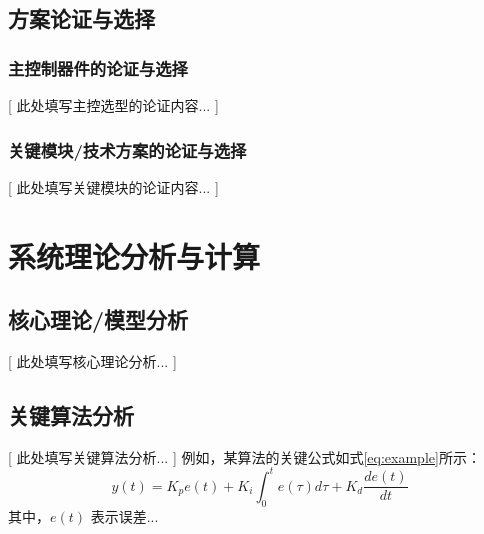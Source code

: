 \documentclass{ctexart}
\begin{document}
\subsection{方案论证与选择}
\subsubsection{主控制器件的论证与选择}
    [ 此处填写主控选型的论证内容... ]

\subsubsection{关键模块/技术方案的论证与选择}
    [ 此处填写关键模块的论证内容... ]

\section{系统理论分析与计算}
\subsection{核心理论/模型分析}
    [ 此处填写核心理论分析... ]
    
    
\subsection{关键算法分析}
    [ 此处填写关键算法分析... ]
    例如，某算法的关键公式如式\ref{eq:example}所示：
    \begin{equation} \label{eq:example}
        y(t) = K_p e(t) + K_i \int_0^t e(\tau)d\tau + K_d \frac{de(t)}{dt}
    \end{equation}
    其中，$e(t)$ 表示误差... %
\end{document}
